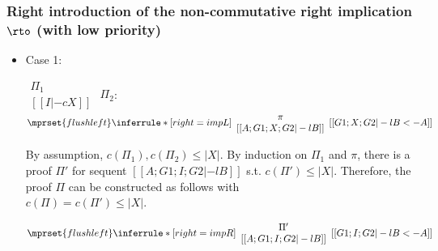 \subsubsection{Right introduction of the non-commutative right implication $\rto$ (with low priority)}
\begin{itemize}
\item Case 1:
      \begin{center}
        \scriptsize
        \begin{math}
          \begin{array}{c}
            \Pi_1 \\
            {[[I |-c X]]}
          \end{array}
        \end{math}
        \qquad\qquad
        $\Pi_2$:
        \begin{math}
          $$\mprset{flushleft}
          \inferrule* [right={\tiny impL}] {
            {
              \begin{array}{c}
                \pi \\
                {[[A; G1; X; G2|-l B]]}
              \end{array}
            }
          }{[[G1; X; G2 |-l B <- A]]}
        \end{math}
      \end{center}
      By assumption, $c(\Pi_1),c(\Pi_2)\leq |X|$. By induction on $\Pi_1$
      and $\pi$, there is a proof $\Pi'$ for sequent
      $[[A; G1; I; G2 |-l B]]$ s.t. $c(\Pi') \leq |X|$. Therefore, the
      proof $\Pi$ can be constructed as follows with \\
      $c(\Pi) = c(\Pi') \leq |X|$.
      \begin{center}
        \scriptsize
        \begin{math}
          $$\mprset{flushleft}
          \inferrule* [right={\tiny impR}] {
            {
              \begin{array}{c}
                \Pi' \\
                {[[A; G1; I; G2 |-l B]]}
              \end{array}
            }
          }{[[G1; I; G2 |-l B <- A]]}
        \end{math}
      \end{center}


\end{itemize}
